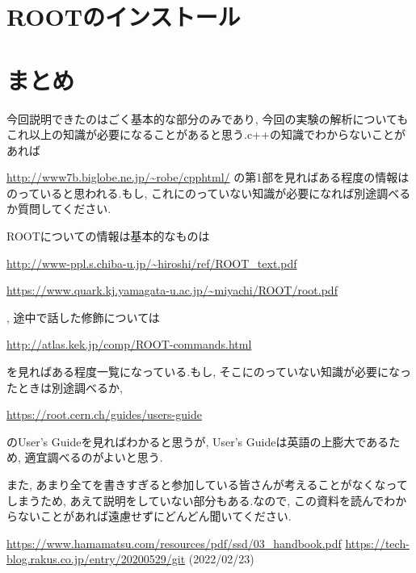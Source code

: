 \documentclass[uplatex,10pt,a4j]{jsarticle}
\begin{document}
\clearpage
\section{ROOTのインストール}
\label{sec:root_installation}


\clearpage
\section{まとめ}
\label{sec:lastsection}
今回説明できたのはごく基本的な部分のみであり, 今回の実験の解析についてもこれ以上の知識が必要になることがあると思う.c++の知識でわからないことがあれば

\url{http://www7b.biglobe.ne.jp/~robe/cpphtml/}
の第1部を見ればある程度の情報はのっていると思われる.もし, これにのっていない知識が必要になれば別途調べるか質問してください.

ROOTについての情報は基本的なものは

\url{http://www-ppl.s.chiba-u.jp/~hiroshi/ref/ROOT_text.pdf}

\url{https://www.quark.kj.yamagata-u.ac.jp/~miyachi/ROOT/root.pdf}

, 途中で話した修飾については

\url{http://atlas.kek.jp/comp/ROOT-commands.html}

を見ればある程度一覧になっている.もし, そこにのっていない知識が必要になったときは別途調べるか, 

\url{https://root.cern.ch/guides/users-guide}

のUser's Guideを見ればわかると思うが, User's Guideは英語の上膨大であるため, 適宜調べるのがよいと思う.

また, あまり全てを書きすぎると参加している皆さんが考えることがなくなってしまうため, あえて説明をしていない部分もある.なので, この資料を読んでわからないことがあれば遠慮せずにどんどん聞いてください.

\begin{thebibliography}{9}
  \url{https://www.hamamatsu.com/resources/pdf/ssd/03_handbook.pdf}
  \url{https://tech-blog.rakus.co.jp/entry/20200529/git} (2022/02/23)
\end{thebibliography}
\end{document}
